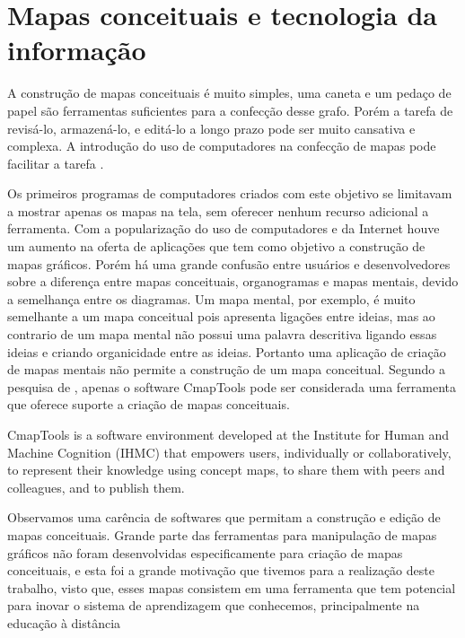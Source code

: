\documentclass[
	12pt,				%
	openright,			%
	oneside,			%
	a4paper,			%
	english,			%
	french,				%
	spanish,			%
	brazil				%
	]{abntex2}
\begin{document}
\section{Mapas conceituais e tecnologia da informação}

A construção de mapas conceituais é muito simples, uma caneta e um pedaço de papel são ferramentas suficientes para a confecção desse grafo. Porém a tarefa de revisá-lo, armazená-lo, e editá-lo a longo prazo  pode ser muito cansativa e complexa. A introdução do uso de computadores na confecção de mapas pode facilitar a tarefa \cite{Novak2006}.

Os primeiros programas de computadores criados com este objetivo se limitavam a mostrar apenas os mapas na tela, sem oferecer nenhum recurso adicional a ferramenta. Com a popularização do uso de computadores e da Internet houve um aumento na oferta de aplicações que tem como objetivo a construção de mapas gráficos. Porém há uma grande confusão entre usuários e desenvolvedores sobre a diferença entre mapas conceituais, organogramas e mapas mentais, devido a semelhança entre os diagramas\cite{Perin2014}. Um mapa mental, por exemplo, é muito semelhante a um mapa conceitual pois apresenta ligações entre ideias, mas ao contrario de um mapa mental não possui uma palavra descritiva ligando essas ideias e criando organicidade entre as ideias. Portanto uma aplicação de criação de mapas mentais não permite a construção de um mapa conceitual. Segundo a pesquisa de , apenas o software CmapTools pode ser considerada uma ferramenta que oferece suporte a criação de mapas conceituais.

\begin{citacao}[english]
	CmapTools  is  a  software  environment  developed  at  the  Institute for Human and Machine Cognition (IHMC) that empowers users, individually or  collaboratively, to represent their knowledge using concept maps, to share them with peers and colleagues, and to publish them\cite{Canas2004}.
\end{citacao}

Observamos uma carência de softwares que permitam a construção e edição de mapas conceituais. Grande parte das ferramentas para manipulação de mapas gráficos não foram desenvolvidas especificamente para criação de mapas conceituais, e esta foi a grande motivação que tivemos para a realização deste trabalho, visto que, esses mapas consistem em uma ferramenta que tem potencial para inovar o sistema de aprendizagem que conhecemos, principalmente na educação à distância
  
\end{document}
